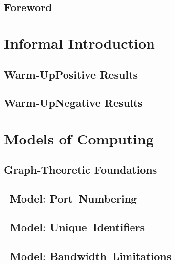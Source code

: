 





\frontmatter
\maketitle
\tableofcontents

\chapter*{Foreword}


\mainmatter
\part{Informal Introduction}

\chapter{Warm-Up\mydash Positive Results}


\chapter{Warm-Up\mydash Negative Results}


\part{Models of Computing}

\chapter{Graph-Theoretic Foundations}


\chapter{\tPN{}~Model: Port~Numbering}\label{ch:pn}


\chapter{\tLOCAL{}~Model: Unique~Identifiers}\label{ch:local}


\chapter{\tCONGEST{}~Model: Bandwidth~Limitations}\label{ch:congest}



